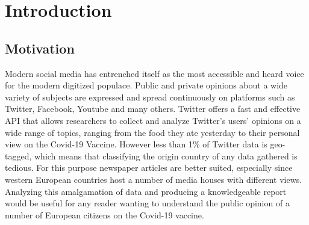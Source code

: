 \chapter{Introduction}


\section{Motivation} %

Modern social media has entrenched itself as the most accessible and heard voice for the modern digitized populace.
Public and private opinions about a wide variety of subjects are expressed and spread continuously on platforms such as Twitter, Facebook, Youtube and many others.
Twitter offers a fast and effective \ac{API} that allows researchers to collect and analyze Twitter's users' opinions on a wide range of topics, ranging from the food they ate yesterday to their personal view on the Covid-19 Vaccine.
However less than 1\% of Twitter data is geo-tagged, which means that classifying the origin country of any data gathered is tedious.
For this purpose newspaper articles are better suited, especially since western European countries host a number of media houses with different views.
Analyzing this amalgamation of data and producing a knowledgeable report would be useful for any reader wanting to understand the public opinion of a number of European citizens on the Covid-19 vaccine.




